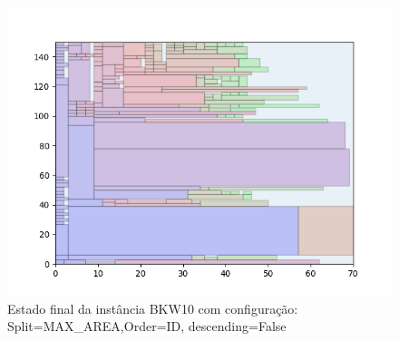 \begin{figure}[H]
    \centering
    \caption[]{Estado final da instância BKW10 com configuração: Split=MAX_AREA,Order=ID, descending=False}
    \label{fig:bkw10-max_area-id-false}
    \includegraphics[scale=0.5]{output/figures/bkw/bkw10/max_area/id/false/000}
\end{figure}